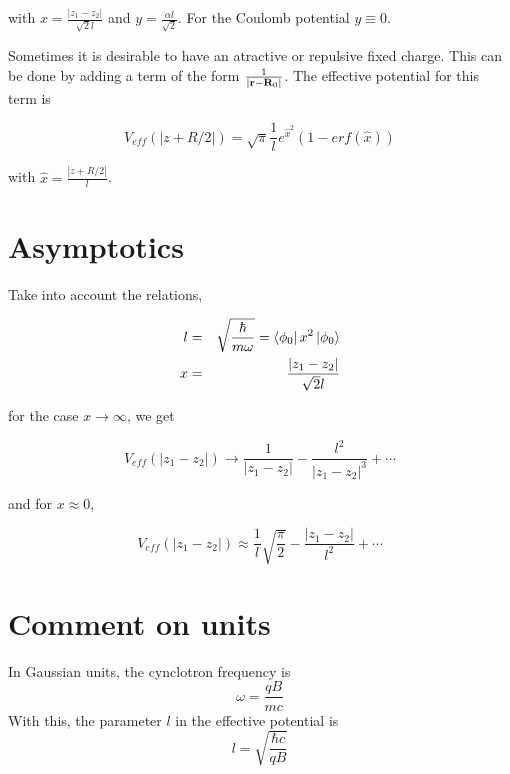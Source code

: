 \documentclass[a4paper,10pt]{article}
\begin{document}
\noindent with $x=\frac{|z_1-z_2|}{\sqrt{2}l}$ and $y=\frac{\alpha l}{\sqrt{2}}$. For the Coulomb potential $y\equiv 0$.

Sometimes it is desirable to have an atractive or repulsive fixed charge. This can be done by adding a term of the form $\frac{1}{|\mathbf{r}-\mathbf{R}_0|}$. The effective potential
for this term is

\begin{equation}
V_{eff}(|z+R/2|) = \sqrt{\pi}\frac{1}{l}e^{\hat{x}^2}(1-erf(\hat{x}))
\end{equation}

\noindent with $\hat{x}=\frac{|z+R/2|}{l}$.

\section*{Asymptotics}

Take into account the relations,

\begin{eqnarray}
l&=&\sqrt{\frac{\hbar}{m \omega}}=\left\langle \phi_{0} \right| x^2 \left| \phi_{0} \right\rangle \\
x&=&\frac{|z_1-z_2|}{\sqrt{2}l}
\end{eqnarray}

\noindent for the case $x\rightarrow \infty$, we get

\begin{equation}
V_{eff}(|z_1-z_2|)\rightarrow \frac{1}{|z_1-z_2|} - \frac{l^2}{|z_1-z_2|^3} + \cdots
\end{equation}

\noindent and for $x\approx 0$,

\begin{equation}
V_{eff}(|z_1-z_2|)\approx \frac{1}{l}\sqrt{\frac{\pi}{2}} - \frac{|z_1-z_2|}{l^2}+ \cdots
\end{equation}

\section*{Comment on units}

In Gaussian units, the cynclotron frequency is
\begin{equation}
\omega = \frac{qB}{mc}
\end{equation}
\noindent
With this, the parameter $l$ in the effective potential is
\begin{equation}
l = \sqrt{\frac{\hbar c}{q B}}
\end{equation}
\end{document}
